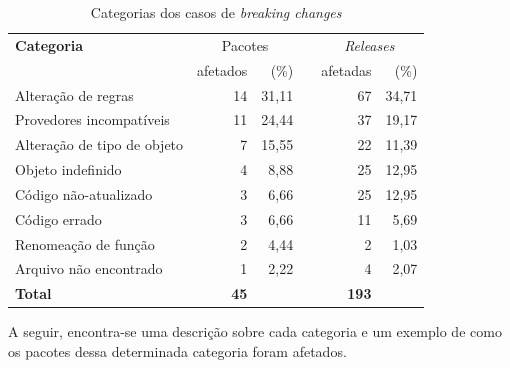 \begin{table}\centering
	\begin{tabular}{lrrrrr} \toprule
		\textbf{Categoria} & \multicolumn{2}{c}{Pacotes} & \phantom{ab} & \multicolumn{2}{c}{\textit{Releases}}
		\\
		\cmidrule{2-3} \cmidrule{5-6}
		& afetados & (\%) && afetadas & (\%) \\ \midrule
		Alteração de regras          & 14              & 31,11 && 67                          & 34,71 \\
		Provedores incompatíveis     & 11              & 24,44 && 37                          & 19,17 \\
		Alteração de tipo de objeto  & 7               & 15,55 && 22                          & 11,39 \\
		Objeto indefinido            & 4               & 8,88  && 25                          & 12,95 \\
		Código não-atualizado        & 3               & 6,66  && 25                          & 12,95 \\
		Código errado                & 3               & 6,66  && 11                          & 5,69  \\
		Renomeação de função         & 2               & 4,44  && 2                           & 1,03  \\
		Arquivo não encontrado       & 1               & 2,22  && 4                           & 2,07  \\ \hline
		\textbf{Total}               & \textbf{45}     &       && \textbf{193}              &       \\
		\bottomrule
	\end{tabular}
    \caption{Categorias dos casos de \textit{breaking changes}}
    \label{tab:bc_category}
\end{table}

A seguir, encontra-se uma descrição sobre cada categoria e um exemplo de como os pacotes dessa determinada categoria foram afetados.


